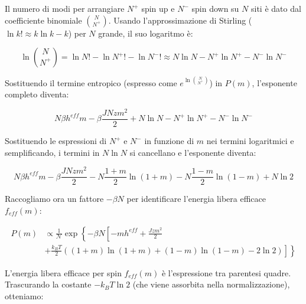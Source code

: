 Il numero di modi per arrangiare $N^+$ spin up e $N^-$ spin down su $N$ siti è dato dal coefficiente binomiale $\binom{N}{N^+}$. Usando l'approssimazione di Stirling ($\ln k! \approx k \ln k - k$) per $N$ grande, il suo logaritmo è:

\begin{equation} \label{eq:ch17_18}
\ln \binom{N}{N^+} = \ln N! - \ln N^+! - \ln N^-! \approx N\ln N - N^+\ln N^+ - N^-\ln N^-
\end{equation}

Sostituendo il termine entropico (espresso come $e^{\ln \binom{N}{N^+}}$) in $P(m)$, l'esponente completo diventa:

\begin{equation} \label{eq:ch17_19}
N\beta h^{eff}m - \beta \frac{J N z m^2}{2} + N\ln N - N^+\ln N^+ - N^-\ln N^-
\end{equation}

Sostituendo le espressioni di $N^+$ e $N^-$ in funzione di $m$ nei termini logaritmici e semplificando, i termini in $N\ln N$ si cancellano e l'esponente diventa:

\begin{equation*}
N\beta h^{eff}m - \beta \frac{J N z m^2}{2} - N\frac{1+m}{2}\ln(1+m) - N\frac{1-m}{2}\ln(1-m) + N\ln 2
\end{equation*}

Raccogliamo ora un fattore $-\beta N$ per identificare l'energia libera efficace $f_{eff}(m)$:

\begin{align} \label{eq:ch17_20}
P(m) &\propto \frac{1}{\mathcal{N}}\exp \left\{ -\beta N \left[ -mh^{eff} + \frac{J z m^2}{2} \right. \right. \nonumber\\ &\left. \left. + \frac{k_B T}{2} \left( (1+m)\ln(1+m) + (1-m)\ln(1-m) - 2\ln 2 \right) \right] \right\}
\end{align}

L'energia libera efficace per spin $f_{eff}(m)$ è l'espressione tra parentesi quadre. Trascurando la costante $-k_B T \ln 2$ (che viene assorbita nella normalizzazione), otteniamo:

\vspace{0.5cm}
\noindent{}
\vspace{0.5cm}


